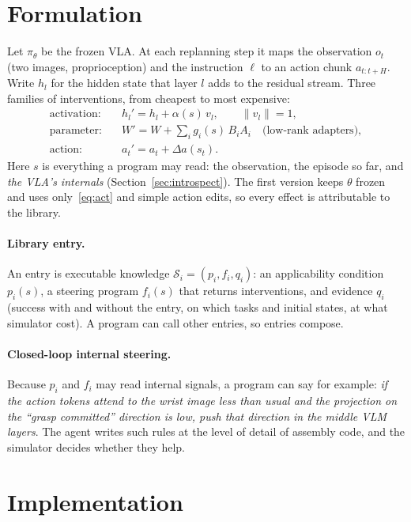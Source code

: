 \documentclass[11pt]{article}
\newcommand{\vla}{\pi_\theta}
\begin{document}
\section{Formulation}

Let $\vla$ be the frozen VLA. At each replanning step it maps the observation $o_t$ (two images, proprioception) and the
instruction $\ell$ to an action chunk $a_{t:t+H}$. Write $h_{l}$ for the hidden state that layer $l$ adds to the residual
stream. Three families of interventions, from cheapest to most expensive:
\begin{align}
\text{activation:}\quad & h_l' = h_l + \alpha(s)\,v_l, \qquad \|v_l\|=1, \label{eq:act}\\
\text{parameter:}\quad & W' = W + \textstyle\sum_i g_i(s)\,B_iA_i \quad\text{(low-rank adapters)}, \\
\text{action:}\quad & a_t' = a_t + \Delta a(s_t).
\end{align}
Here $s$ is everything a program may read: the observation, the episode so far, and \emph{the VLA's internals}
(Section~\ref{sec:introspect}). The first version keeps $\theta$ frozen and uses only~\eqref{eq:act} and simple
action edits, so every effect is attributable to the library.

\paragraph{Library entry.} An entry is executable knowledge $\mathcal S_i=(p_i,f_i,q_i)$: an applicability condition
$p_i(s)$, a steering program $f_i(s)$ that returns interventions, and evidence $q_i$ (success with and without the entry, on
which tasks and initial states, at what simulator cost). A program can call other entries, so entries compose.

\paragraph{Closed-loop internal steering.} Because $p_i$ and $f_i$ may read internal signals, a program can say for
example: \emph{if the action tokens attend to the wrist image less than usual and the projection on the ``grasp
committed'' direction is low, push that direction in the middle VLM layers}. The agent writes such rules at the level of
detail of assembly code, and the simulator decides whether they help.

\section{Implementation}
\end{document}
